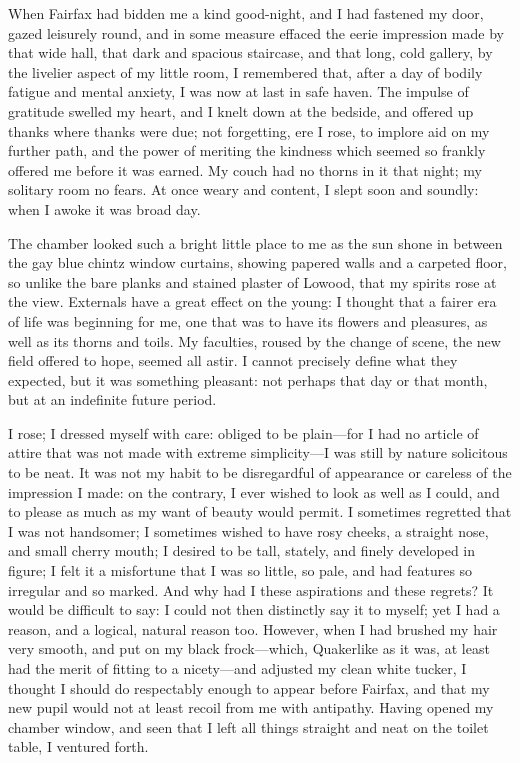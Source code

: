 When \Mrs{} Fairfax had bidden me a kind good-night, and I had fastened my
door, gazed leisurely round, and in some measure effaced the eerie
impression made by that wide hall, that dark and spacious staircase, and
that long, cold gallery, by the livelier aspect of my little room, I
remembered that, after a day of bodily fatigue and mental anxiety, I was
now at last in safe haven. The impulse of gratitude swelled my heart,
and I knelt down at the bedside, and offered up thanks where thanks were
due; not forgetting, ere I rose, to implore aid on my further path, and
the power of meriting the kindness which seemed so frankly offered me
before it was earned. My couch had no thorns in it that night; my
solitary room no fears. At once weary and content, I slept soon and
soundly: when I awoke it was broad day.

The chamber looked such a bright little place to me as the sun shone in
between the gay blue chintz window curtains, showing papered walls and a
carpeted floor, so unlike the bare planks and stained plaster of Lowood,
that my spirits rose at the view. Externals have a great effect on the
young: I thought that a fairer era of life was beginning for me, one
that was to have its flowers and pleasures, as well as its thorns and
toils. My faculties, roused by the change of scene, the new field
offered to hope, seemed all astir. I cannot precisely define what they
expected, but it was something pleasant: not perhaps that day or that
month, but at an indefinite future period.

I rose; I dressed myself with care: obliged to be plain---for I had no
article of attire that was not made with extreme simplicity---I was
still by nature solicitous to be neat. It was not my habit to be
disregardful of appearance or careless of the impression I made: on the
contrary, I ever wished to look as well as I could, and to please as
much as my want of beauty would permit. I sometimes regretted that I
was not handsomer; I sometimes wished to have rosy cheeks, a straight
nose, and small cherry mouth; I desired to be tall, stately, and finely
developed in figure; I felt it a misfortune that I was so little, so
pale, and had features so irregular and so marked. And why had I these
aspirations and these regrets? It would be difficult to say: I could
not then distinctly say it to myself; yet I had a reason, and a logical,
natural reason too. However, when I had brushed my hair very smooth,
and put on my black frock---which, Quakerlike as it was, at least had
the merit of fitting to a nicety---and adjusted my clean white tucker, I
thought I should do respectably enough to appear before \Mrs{} Fairfax,
and that my new pupil would not at least recoil from me with antipathy.
Having opened my chamber window, and seen that I left all things
straight and neat on the toilet table, I ventured forth.

